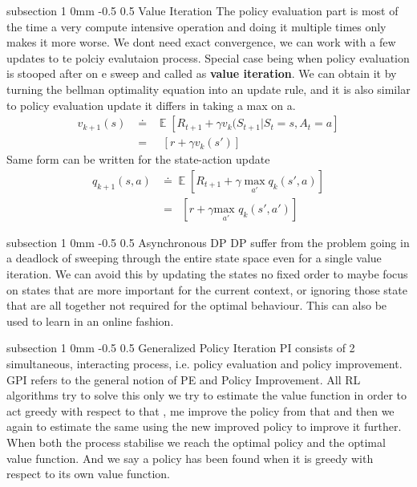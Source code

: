 \documentclass[twocolumn,11pt]{article}
\makeatletter
\DeclareMathOperator{\E}{\mathbb{E}}
\DeclareMathOperator{\maxa}{\underset{a}{\text{max }}}
\DeclareMathOperator{\dynamics}{\sum_{s',r} p(s',r|s,a)}
\renewcommand{\subsection}{\@startsection
{subsection}%
{1}%
{0mm}%
{-0.5\baselineskip}%
{0.5\baselineskip}%
{\bfseries\color{blue}}} %
\makeatother
\begin{document}
\subsection{Value Iteration} 
The policy evaluation part is most of the time a very compute intensive operation and doing it multiple times only makes it more worse. We dont need exact convergence, we can work with a few updates to te polciy evalutaion process. Special case being when policy evaluation is stooped after on e sweep and called as \textbf{value iteration}.
We can obtain it by turning the bellman optimality equation into an update rule, and it is also similar to policy evaluation update it differs in taking a max on a.
\begin{align}
	v_{k+1}(s) &\doteq \maxa \E[R_{t+1} + \gamma v_{k}(S_{t+1}|S_{t} = s , A_{t}=a]\\
	&= \maxa \dynamics [r + \gamma v_{k}(s')]
\end{align}
Same form can be written for the state-action update
\begin{align}
	q_{k+1}(s,a) &\doteq \E[R_{t+1} + \gamma \underset{a'}{\max} q_{k}(s',a)]\\
&= \dynamics [r + \gamma \underset{a'}{\text{max }} q_{k}(s',a')]
\end{align}

\subsection{Asynchronous DP}
DP suffer from the problem going in a deadlock of sweeping through the entire state space even for a single value iteration. We can avoid this by updating the states no fixed order to maybe focus on states that are more important for the current context, or ignoring those state that are all together not required for the optimal behaviour. This  can also be used  to learn  in an online fashion. 

\subsection{Generalized Policy Iteration}
PI consists of 2 simultaneous, interacting process, i.e. policy evaluation and policy improvement. GPI refers to the general notion of PE and Policy Improvement. All RL algorithms try to solve this only we try to estimate the value function in order to act greedy with respect to that , me improve the policy from that and then we again to estimate the  same using the new improved policy to improve it further. When both the process stabilise we reach the optimal policy and the optimal value function. And we  say a policy has been found when it is greedy with respect to its own value function. 
\end{document}
